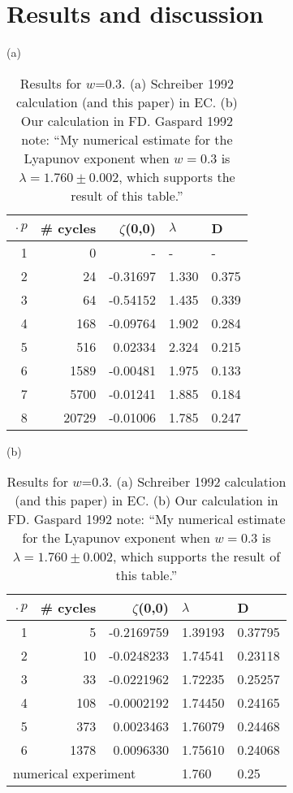 \documentclass[aps,pre,
                showpacs,
                twocolumn,
                groupedaddress,
                floatfix]{revtex4-1}
\begin{document}
\section{Results and discussion}

\begin{table}[htbp]
{\small
(a)\\
\begin{tabular}{|r|r|r|l|l|}
\hline
$\period{p}$ & \# cycles & $\zeta$(0,0) & $\lambda$ & D \\ \hline\hline
1      & 0      &   -    &   -  &   - \\
2      & 24     & -0.31697 & 1.330 & 0.375\\
3      & 64     & -0.54152 & 1.435 & 0.339\\
4      & 168    & -0.09764 & 1.902 & 0.284\\
5      & 516    &  0.02334 & 2.324 & 0.215\\
6      & 1589   & -0.00481 & 1.975 & 0.133\\
7      & 5700   & -0.01241 & 1.885 & 0.184\\
8      & 20729  & -0.01006 & 1.785 & 0.247\\ \hline

\end{tabular}
\hfill
{}
(b)\\
\begin{tabular}{|r|r|r|l|l|}
\hline
$\period{p}$ & \# cycles & $\zeta$(0,0) & $\lambda$ & D \\ \hline\hline
1      & 5      & -0.2169759 & 1.39193 & 0.37795 \\
2      & 10     & -0.0248233 & 1.74541 & 0.23118\\
3      & 33     & -0.0221962 & 1.72235 & 0.25257\\
4      & 108    & -0.0002192 & 1.74450 & 0.24165\\
5      & 373    &  0.0023463 & 1.76079 & 0.24468\\
6      & 1378   &  0.0096330 & 1.75610 & 0.24068\\ \hline\hline
\multicolumn{3}{|l|}{numerical experiment}
                           & 1.760 & 0.25
\\ \hline
\end{tabular}
}

\caption{\label{TCELL2}
  Results for $w$=0.3. (a) Schreiber 1992 calculation (and
  this paper) in EC. (b) Our calculation in FD. Gaspard 1992
  note: ``My numerical estimate for the Lyapunov exponent when $w=0.3$ is
  $\lambda = 1.760 \pm 0.002$, which supports the result of this table.''
}
\end{table}
\end{document}
